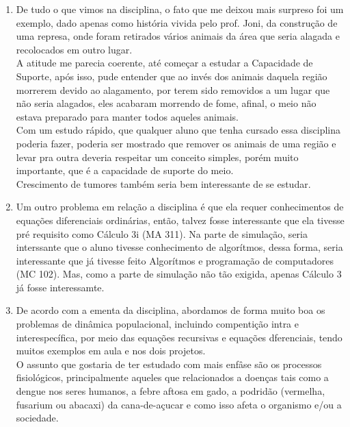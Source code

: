 \documentclass[a4paper]{article}
\begin{document}
\begin{enumerate}
\item
De tudo o que vimos na disciplina, o fato que me deixou mais surpreso foi um exemplo, dado apenas como hist\'oria vivida pelo prof. Joni, da constru\c{c}\~ao de uma represa, onde foram retirados v\'arios animais da \'area que seria alagada e recolocados em outro lugar.
\\
A atitude me parecia coerente, at\'e come\c{c}ar a estudar a Capacidade de Suporte, ap\'os isso, pude entender que ao inv\'es dos animais daquela regi\~ao morrerem devido ao alagamento, por terem sido removidos a um lugar que n\~ao seria alagados, eles acabaram morrendo de fome, afinal, o meio n\~ao estava preparado para manter todos aqueles animais.
\\
Com um estudo r\'apido, que qualquer aluno que tenha cursado essa disciplina poderia fazer, poderia ser mostrado que remover os animais de uma regi\~ao e levar pra outra deveria respeitar um conceito simples, por\'em muito importante, que \'e a capacidade de suporte do meio.
\\
Crescimento de tumores tamb\'em seria bem interessante de se estudar.
\\
\item
Um outro problema em rela\c{c}\~ao a disciplina \'e que ela requer conhecimentos de equa\c{c}\~oes diferenciais ordin\'arias, ent\~ao, talvez fosse interessante que ela tivesse pr\'e requisito como C\'alculo 3i (MA 311). Na parte de simula\c{c}\~ao, seria interssante que o aluno tivesse conhecimento de algor\'itmos, dessa forma, seria interessante que j\'a tivesse feito Algor\'itmos e programa\c{c}\~ao de computadores (MC 102). Mas, como a parte de simula\c{c}\~ao n\~ao t\~ao exigida, apenas C\'alculo 3 j\'a fosse interessamte. 
\\
\item
De acordo com a ementa da disciplina, abordamos de forma muito boa os problemas de din\^amica populacional, incluindo compenti\c{c}\~ao intra e interespec\'ifica, por meio das equa\c{c}\~oes recursivas e equa\c{c}\~oes dferenciais, tendo muitos exemplos em aula e nos dois projetos. 
\\
O assunto que gostaria de ter estudado com mais enf\^ase são os processos fisiol\'ogicos, principalmente aqueles que relacionados a doen\c{c}as tais como a dengue nos seres humanos, a febre aftosa em gado, a podrid\~ao (vermelha, fusarium ou abacaxi) da cana-de-a\c{c}ucar e como isso afeta o organismo e/ou a sociedade. 

\end{enumerate}
\end{document}
